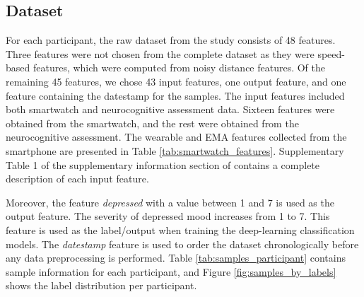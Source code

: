 \subsection{Dataset}
\label{sec:dataset}
For each participant, the raw dataset from the study consists of 48 features. Three features were not chosen from the complete dataset as they were speed-based features, which were computed from noisy distance features. Of the remaining 45 features, we chose 43 input features, one output feature, and one feature containing the datestamp for the samples. The input features included both smartwatch and neurocognitive assessment data. Sixteen features were obtained from the smartwatch, and the rest were obtained from the neurocognitive assessment. The wearable and EMA features collected from the smartphone are presented in Table \ref{tab:smartwatch_features}. Supplementary Table 1 of the supplementary information section of \cite{shah_personalized_2021} contains a complete description of each input feature. 

Moreover, the feature \emph{depressed} with a value between 1 and 7 is used as the output feature. The severity of depressed mood increases from 1 to 7. This feature is used as the label/output when training the deep-learning classification models. The \emph{datestamp} feature is used to order the dataset chronologically before any data preprocessing is performed. Table \ref{tab:samples_participant} contains sample information for each participant, and Figure \ref{fig:samples_by_labels} shows the label distribution per participant.


